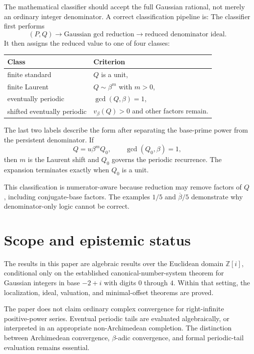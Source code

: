 \documentclass[11pt]{article}
\theoremstyle{definition}
\newcommand{\Zi}{\mathbb{Z}[i]}
\begin{document}
The mathematical classifier should accept the full Gaussian rational, not merely an ordinary integer denominator.  A correct classification pipeline is:
The classifier first performs
\[
(P,Q)
\longrightarrow
\text{Gaussian gcd reduction}
\longrightarrow
\text{reduced denominator ideal}.
\]
It then assigns the reduced value to one of four classes:
\begin{center}
\begin{tabular}{@{}ll@{}}
\toprule
Class & Criterion \\
\midrule
finite standard & $Q$ is a unit, \\
finite Laurent & $Q\sim\beta^m$ with $m>0$, \\
eventually periodic & $\gcd(Q,\beta)=1$, \\
shifted eventually periodic & $v_\beta(Q)>0$ and other factors remain. \\
\bottomrule
\end{tabular}
\end{center}

The last two labels describe the form after separating the base-prime power from the persistent denominator.  If
\[
Q=u\beta^mQ_0,
\qquad
\gcd(Q_0,\beta)=1,
\]
then $m$ is the Laurent shift and $Q_0$ governs the periodic recurrence.  The expansion terminates exactly when $Q_0$ is a unit.

This classification is numerator-aware because reduction may remove factors of $Q$, including conjugate-base factors.  The examples $1/5$ and $\overline\beta/5$ demonstrate why denominator-only logic cannot be correct.

\section{Scope and epistemic status}

The results in this paper are algebraic results over the Euclidean domain $\Zi$, conditional only on the established canonical-number-system theorem for Gaussian integers in base $-2+i$ with digits $0$ through $4$.  Within that setting, the localization, ideal, valuation, and minimal-offset theorems are proved.

The paper does not claim ordinary complex convergence for right-infinite positive-power series.  Eventual periodic tails are evaluated algebraically, or interpreted in an appropriate non-Archimedean completion.  The distinction between Archimedean convergence, $\beta$-adic convergence, and formal periodic-tail evaluation remains essential.
\end{document}
